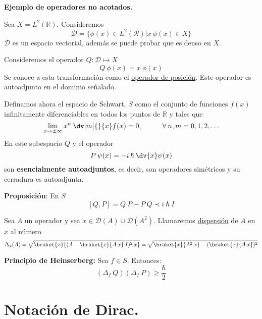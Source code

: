 \textbf{Ejemplo de operadores no acotados.}
\begin{ejemplo}
Sea $X = L^{2}(\mathbb{R})$. Consideremos
\[ \mathcal{D} = \{ \phi (x) \in L^{2}(\mathcal{R}) \vert x \: \phi (x) \in X \} \]
$\mathcal{D}$ es un espacio vectorial, además se puede probar que es denso en $X$.
\par
Consideremos el operador $Q: \mathcal{D} \mapsto X$
\[ Q \: \phi(x) =  x \: \phi (x) \]
Se conoce a esta transformación como el \underline{operador de posición}. Este operador es autoadjunto en el dominio señalado.
\end{ejemplo}
\begin{ejemplo}
Definamos ahora el espacio de Schwart, $S$ como el conjunto de funciones $f(x)$ infinitamente diferenciables en todos los puntos de $\mathbb{R}$ y tales que
\[ \lim_{x \to \pm \infty} x^{n} \: \dv[m]{}{x} f(x) = 0, \hspace{1cm} \forall \: n, m = 0, 1, 2, \ldots \]
En este subespacio $Q$ y el operador
\[ P \: \psi (x) = - i \, \hbar \: \dv{x} \psi (x) \]
son \textbf{esencialmente autoadjuntos}, es decir, son operadores simétricos y su cerradura es autoadjunta.
\end{ejemplo}
\textbf{Proposición}: En $S$
\[ [Q, P] = Q \: P - P \: Q \prec i \: \hbar \: I \]
\begin{defi}
Sea $A$ un operador y sea $x \in \mathcal{D}(A) \cup \mathcal{D}(A^{2})$. Llamaremos \underline{dispersión} de $A$ en $x$ al número
\[ \Delta_{x} (A) = \sqrt{\braket{x}{(A - \braket{x}{A \: x} \: I)^{2} \: x}} = \sqrt{\braket{x}{A^{2} \: x} - (\braket{x}{A \: x})^{2}} \]
\end{defi}
\textbf{Principio de Heinserberg:} Sea $f \in S$. Entonces:
\[ (\Delta_{f} \: Q)(\Delta_{f} \: P) \geq \dfrac{\hbar}{2} \]
\section{Notación de Dirac.}
